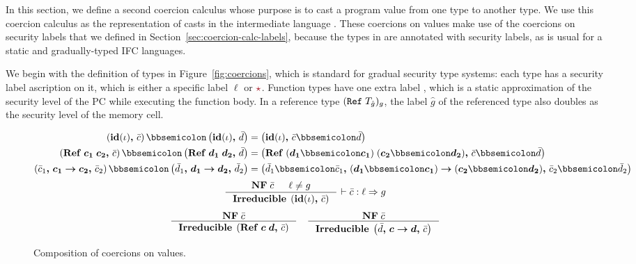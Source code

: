 In this section, we define a second coercion calculus whose purpose is to cast a
program value from one type to another type. We use this coercion calculus as
the representation of casts in the intermediate language \CC. These coercions on
values make use of the coercions on security labels that we defined in
Section~\ref{sec:coercion-calc-labels}, because the types in \CC are annotated
with security labels, as is usual for a static and gradually-typed IFC
languages.

We begin with the definition of types in Figure~\ref{fig:coercions}, which is
standard for gradual security type systems: each type has a security label
ascription on it, which is either a specific label $\ell$ or $\unk$. Function
types have one extra label \gc, which is a static approximation of the security
level of the PC while executing the function body. In a reference type
$(\mathtt{Ref}\;{T_{\hat{g}}})_g$, the label $\hat{g}$ of the referenced type also
doubles as the security level of the memory cell.

\begin{figure}[tbp]
\raggedright
  {\small
\begin{align*}
\left( \coerc{\id{\iota}}{\bar{c}} \right) \mdoubleplus \left( \coerc{\id{\iota}}{\bar{d}} \right) &= \left( \coerc{\id{\iota}}{\bar{c} \mdoubleplus \bar{d}} \right) \\
\left( \coerc{\refco{\bm{c_1}}{\bm{c_2}}}{\bar{c}} \right) \mdoubleplus \left( \coerc{\refco{\bm{d_1}}{\bm{d_2}}}{\bar{d}} \right) &= \left( \coerc{\refco{(\bm{d_1} \mdoubleplus \bm{c_1})}{(\bm{c_2} \mdoubleplus \bm{d_2})}}{\bar{c} \mdoubleplus \bar{d}} \right) \\
\left( \coerc{\funco{\bar{c}_1}{\bm{c_1}}{\bm{c_2}}}{\bar{c}_2} \right) \mdoubleplus \left( \coerc{\funco{\bar{d}_1}{\bm{d_1}}{\bm{d_2}}}{\bar{d}_2} \right) &= \left( \coerc{\funco{\bar{d}_1 \mdoubleplus \bar{c}_1}{(\bm{d_1} \mdoubleplus \bm{c_1})}{(\bm{c_2} \mdoubleplus \bm{d_2})}}{\bar{c}_2 \mdoubleplus \bar{d}_2} \right)
\end{align*}
  }
  {\small
  \begin{gather*}
    \inference{\mathbf{NF} \; \bar{c} & \ell \neq g}
    {\mathbf{Irreducible} \; \left( \coerc{\id{\iota}}{\bar{c}} \right)}
    ~{\vdash \bar{c} : \ell \Rightarrow g}
    \\[1ex]
    \inference{\mathbf{NF} \; \bar{c}}
    {\mathbf{Irreducible} \; \left( \coerc{\refco{\bm{c}}{\bm{d}}}{\bar{c}} \right)}
    \quad
    \inference{\mathbf{NF} \; \bar{c}}
    {\mathbf{Irreducible} \; \left( \coerc{\funco{\bar{d}}{\bm{c}}{\bm{d}}}{\bar{c}} \right)}
  \end{gather*}}
  \caption{Composition of coercions on values.}
  \label{fig:coercion-composition}
\end{figure}

